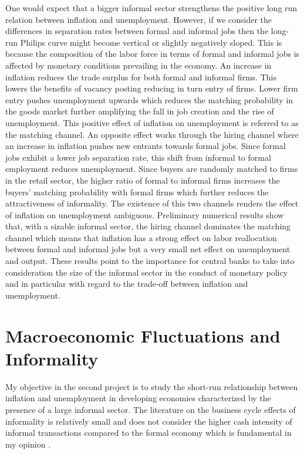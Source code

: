 \documentclass[12pt,a4paper,titlepage]{article}
\begin{document}
One would expect that a bigger informal sector strengthens the positive long run relation between inflation and unemployment. However, if we consider the differences in separation rates between formal and informal jobs then the long-run Philips curve might become vertical or slightly negatively sloped. This is because the composition of the labor force in terms of formal and informal jobs is affected by monetary conditions prevailing in the economy. An increase in inflation reduces the trade surplus for both formal and informal firms. This lowers the benefits of vacancy posting reducing in turn entry of firms. Lower firm entry pushes unemployment upwards which reduces the matching probability in the goods market further amplifying the fall in job creation and the rise of unemployment. This positive effect of inflation on unemployment is referred to as the matching channel. An opposite effect works through the hiring channel where an increase in inflation pushes new entrants towards formal jobs. Since formal jobs exhibit a lower job separation rate, this shift from informal to formal employment reduces unemployment. Since buyers are randomly matched to firms in the retail sector, the higher ratio of formal to informal firms increases the buyers' matching probability with formal firms which further reduces the attractiveness of informality. The existence of this two channels renders the effect of inflation on unemployment ambiguous. Preliminary numerical results show that, with a sizable informal sector, the hiring channel dominates the matching channel which means that inflation has a strong effect on labor reallocation between formal and informal jobs but a very small net effect on unemployment and output. These results point to the importance for central banks to take into consideration the size of the informal sector in the conduct of monetary policy and in particular with regard to the trade-off between inflation and unemployment.

\section{Macroeconomic Fluctuations and Informality}

My objective in the second project is to study the short-run relationship between inflation and unemployment in developing economies characterized by the presence of a large informal sector. The literature on the business cycle effects of informality is relatively small and does not consider the higher cash intensity of informal transactions compared to the formal economy which is fundamental in my opinion \citep{Conesa2002, Fiess2007, Castillo2008}.
\end{document}
